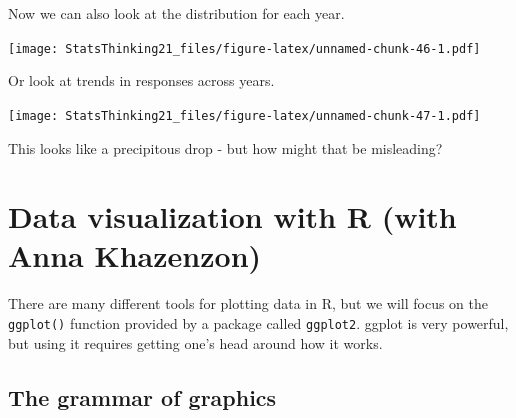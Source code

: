 \documentclass[12pt,]{book}
\newenvironment{Shaded}{\begin{snugshade}}{\end{snugshade}}
\newcommand{\DataTypeTok}[1]{\textcolor[rgb]{0.13,0.29,0.53}{#1}}
\newcommand{\KeywordTok}[1]{\textcolor[rgb]{0.13,0.29,0.53}{\textbf{#1}}}
\newcommand{\NormalTok}[1]{#1}
\newcommand{\OperatorTok}[1]{\textcolor[rgb]{0.81,0.36,0.00}{\textbf{#1}}}
\newcommand{\StringTok}[1]{\textcolor[rgb]{0.31,0.60,0.02}{#1}}
\begin{document}
Now we can also look at the distribution for each year.

\begin{Shaded}
\end{Shaded}

\texttt{[image: StatsThinking21\_files/figure-latex/unnamed-chunk-46-1.pdf]}

Or look at trends in responses across years.

\begin{Shaded}
\end{Shaded}

\texttt{[image: StatsThinking21\_files/figure-latex/unnamed-chunk-47-1.pdf]}

This looks like a precipitous drop - but how might that be misleading?

\hypertarget{data-visualization-with-r-with-anna-khazenzon}{%
\chapter{Data visualization with R (with Anna Khazenzon)}\label{data-visualization-with-r-with-anna-khazenzon}}

There are many different tools for plotting data in R, but we will focus on the \texttt{ggplot()} function provided by a package called \texttt{ggplot2}. ggplot is very powerful, but using it requires getting one's head around how it works.

\hypertarget{the-grammar-of-graphics}{%
\section{The grammar of graphics}\label{the-grammar-of-graphics}}
\end{document}
